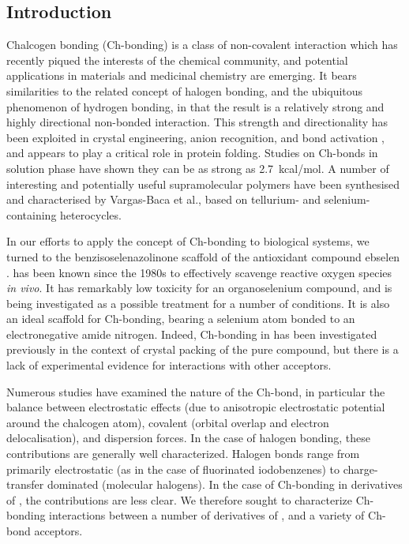 \begin{refsection}
\section{Introduction}
Chalcogen bonding (Ch-bonding) is a class of non-covalent interaction which has recently piqued the interests of the chemical community, and potential applications in materials and medicinal chemistry are emerging.\autocite{Mitchell2017,Wonner2017a,Fanfrlik2014,Vogel2019}
It bears similarities to the related concept of halogen bonding, and the ubiquitous phenomenon of hydrogen bonding, in that the result is a relatively strong and highly directional non-bonded interaction.\autocite{Paolo1974}
This strength and directionality has been exploited in crystal engineering\autocite{Gleiter2003,Kremer2016,Huynh2017}, anion recognition\autocite{Lim2017,Lim2018,Garrett2016}, and bond activation \autocite{Wonner2017,Benz2017,Benz2017a}, and appears to play a critical role in protein folding\autocite{Iwaoka2001,Iwaoka2015}.
Studies on  Ch-bonds in solution phase have shown they can be as strong as 2.7~kcal/mol\autocite{Garrett2015a}.
A number of interesting and potentially useful supramolecular polymers have been synthesised and characterised by Vargas-Baca et al., based on tellurium- and selenium-containing heterocycles\autocite{Ho2016,Ho2017}.

In our efforts to apply the concept of Ch-bonding to biological systems, we turned to the benzisoselenazolinone scaffold of the antioxidant compound ebselen .
 has been known since the 1980s to effectively scavenge reactive oxygen species \emph{in vivo}.\autocite{Muller1984}
It has remarkably low toxicity for an organoselenium compound, and is being investigated as a possible treatment for a number of conditions.\autocite{Schewe1995,Kil2007,Singh2013,Parnham2000}
It is also an ideal scaffold for Ch-bonding, bearing a selenium atom bonded to an electronegative amide nitrogen.
Indeed, Ch-bonding in  has been investigated previously in the context of crystal packing of the pure compound, but there is a lack of experimental evidence for interactions with other acceptors.\autocite{Thomas2015}

Numerous studies have examined the nature of the Ch-bond, in particular the balance between electrostatic effects (due to anisotropic electrostatic potential around the chalcogen atom), covalent (orbital overlap and electron delocalisation), and dispersion forces.\autocite{Oliveira2017,Pascoe2017,DeVleeschouwer2017,Kolar2016,Gleiter2018}
In the case of halogen bonding, these contributions are generally well characterized.
Halogen bonds range from primarily electrostatic (as in the case of fluorinated iodobenzenes\autocite{Prasang2009}) to charge-transfer dominated (molecular halogens\autocite{Mulliken1950}).
In the case of Ch-bonding in derivatives of , the contributions are less clear.
We therefore sought to characterize Ch-bonding interactions between a number of derivatives of , and a variety of Ch-bond acceptors.



\end{refsection}
